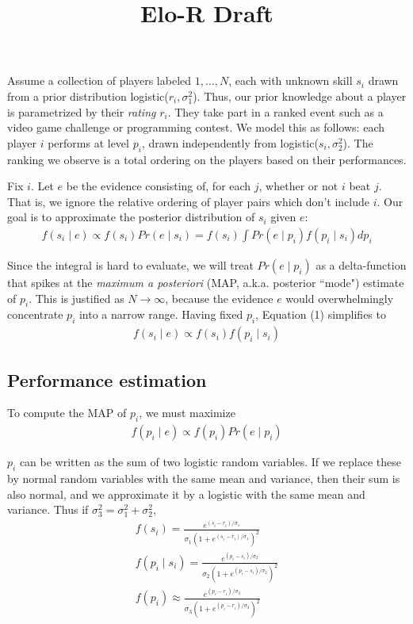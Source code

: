 \documentclass{article}
\title{Elo-R Draft}
\begin{document}
\maketitle

Assume a collection of players labeled $1,\ldots,N$, each with unknown skill $s_i$ drawn from a prior distribution logistic($r_i, \sigma_1^2$). Thus, our prior knowledge about a player is parametrized by their \emph{rating} $r_i$. They take part in a ranked event such as a video game challenge or programming contest. We model this as follows: each player $i$ performs at level $p_i$, drawn independently from logistic($s_i, \sigma_2^2$). The ranking we observe is a total ordering on the players based on their performances.

Fix $i$. Let $e$ be the evidence consisting of, for each $j$, whether or not $i$ beat $j$. That is, we ignore the relative ordering of player pairs which don't include $i$. Our goal is to approximate the posterior distribution of $s_i$ given $e$:
\begin{align}
f(s_i\mid e) \propto f(s_i)Pr(e\mid s_i) = f(s_i)\int Pr(e\mid p_i)f(p_i\mid s_i)dp_i
\end{align}

Since the integral is hard to evaluate, we will treat $Pr(e\mid p_i)$ as a delta-function that spikes at the \emph{maximum a posteriori} (MAP, a.k.a. posterior ``mode") estimate of $p_i$. This is justified as $N \rightarrow \infty$, because the evidence $e$ would overwhelmingly concentrate $p_i$ into a narrow range. Having fixed $p_i$, Equation (1) simplifies to
\begin{align}
f(s_i\mid e) \propto f(s_i)f(p_i\mid s_i)
\end{align}

\subsection{Performance estimation}

To compute the MAP of $p_i$, we must maximize
\begin{align}
f(p_i\mid e) \propto f(p_i) Pr(e\mid p_i)
\end{align}

$p_i$ can be written as the sum of two logistic random variables. If we replace these by normal random variables with the same mean and variance, then their sum is also normal, and we approximate it by a logistic with the same mean and variance. Thus if $\sigma_3^2 = \sigma_1^2 + \sigma_2^2$,
\begin{align}
f(s_i) = \frac { e^{(s_i-r_i)/\sigma_1} } {\sigma_1\left(1 + e^{(s_i-r_i)/\sigma_1} \right)^2}
\\f(p_i\mid s_i) = \frac { e^{(p_i-s_i)/\sigma_2} } {\sigma_2\left(1 + e^{(p_i-s_i)/\sigma_2} \right)^2}
\\f(p_i) \approx \frac { e^{(p_i-r_i)/\sigma_3} } {\sigma_3\left(1 + e^{(p_i-r_i)/\sigma_3} \right)^2}
\end{align}
\end{document}
